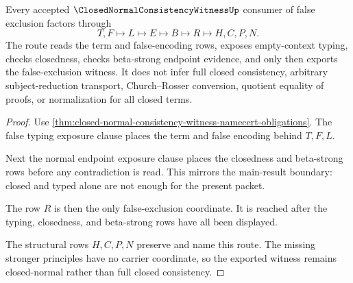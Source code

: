 \begin{theorem}\label{thm:closed-normal-consistency-witness-false-exclusion-factorization}
Every accepted $\ClosedNormalConsistencyWitnessUp$ consumer of false exclusion factors through
$$
T,F \longmapsto L \longmapsto E \longmapsto B \longmapsto R \longmapsto H,C,P,N.
$$
The route reads the term and false-encoding rows, exposes empty-context typing, checks closedness, checks beta-strong endpoint evidence, and only then exports the false-exclusion witness. It does not infer full closed consistency, arbitrary subject-reduction transport, Church--Rosser conversion, quotient equality of proofs, or normalization for all closed terms.
\end{theorem}
\begin{proof}
Use \autoref{thm:closed-normal-consistency-witness-namecert-obligations}. The false typing exposure clause places the term and false encoding behind $T,F,L$.

Next the normal endpoint exposure clause places the closedness and beta-strong rows before any contradiction is read. This mirrors the main-result boundary: closed and typed alone are not enough for the present packet.

The row $R$ is then the only false-exclusion coordinate. It is reached after the typing, closedness, and beta-strong rows have all been displayed.

The structural rows $H,C,P,N$ preserve and name this route. The missing stronger principles have no carrier coordinate, so the exported witness remains closed-normal rather than full closed consistency.
\end{proof}


